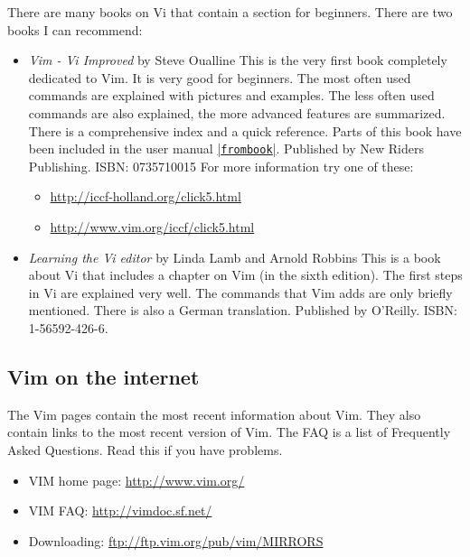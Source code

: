 \label{book}
There are many books on Vi that contain a section for beginners.
There are two books I can recommend:
\begin{itemize}

				\item
								\textit{Vim - Vi Improved} by Steve Oualline\newline
								This is the very first book completely dedicated to Vim.
								It is very good for beginners.
								The most often used commands are explained with pictures and examples.
								The less often used commands are also explained, the more advanced features are summarized.
								There is a comprehensive index and a quick reference.
								Parts of this book have been included in the user manual \hyperref[frombook]{|\texttt{frombook}|}.
								Published by New Riders Publishing.
								ISBN: 0735710015
								For more information try one of these:
								\begin{itemize}
												\item \url{http://iccf-holland.org/click5.html}
												\item \url{http://www.vim.org/iccf/click5.html}
								\end{itemize}

				\item
								\textit{Learning the Vi editor} by Linda Lamb and Arnold Robbins\newline
								This is a book about Vi that includes a chapter on Vim (in the sixth edition).
								The first steps in Vi are explained very well.
								The commands that Vim adds are only briefly mentioned.
								There is also a German translation.
								Published by O'Reilly.
								ISBN: 1-56592-426-6.
\end{itemize}

\subsection{Vim on the internet}
\label{internet}
\label{www}
\label{WWW}
\label{faq}
\label{FAQ}
\label{distribution}
\label{download}
The Vim pages contain the most recent information about Vim.
They also contain links to the most recent version of Vim.
The FAQ is a list of Frequently Asked Questions.
Read this if you have problems.

\begin{itemize}
				\item VIM home page: \url{http://www.vim.org/}
				\item VIM FAQ: \url{http://vimdoc.sf.net/}
				\item Downloading: \url{ftp://ftp.vim.org/pub/vim/MIRRORS}
\end{itemize}

